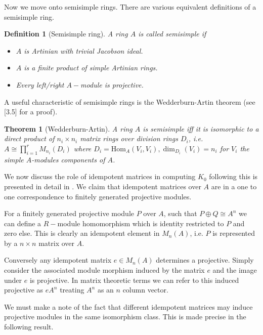 \documentclass[12pt]{report}
\numberwithin{equation}{section}
\newcommand{\Hom}{{\mathrm{Hom}}}
\newcounter{dummy} \numberwithin{dummy}{section}
\newtheorem{theorem}[dummy]{Theorem}
\newtheorem{definition}[dummy]{Definition}
\begin{document}
	
	Now we move onto semisimple rings. There are various equivalent definitions of a semisimple ring.
	\begin{definition}[Semisimple ring]
		A ring $A$ is called semisimple if
		\begin{itemize}
			\item $A$ is Artinian with trivial Jacobson ideal.
			\item $A$ is a finite product of simple Artinian rings.
			\item Every left/right $A-$module is projective.
		\end{itemize}
	\end{definition}
	
	A useful characteristic of semisimple rings is the Wedderburn-Artin theorem (see \cite{lam2001first}[3.5] for a proof).

	\begin{theorem}[Wedderburn-Artin]\label{wedart}
		A ring $A$ is semisimple iff it is isomorphic to a direct product of $n_i \times n_i$ matrix rings over division rings $D_i$, i.e. $A \cong \prod_{i=1}^r M_{n_i}(D_i)$ where $D_i =\Hom_A(V_i,V_i), \dim_{D_i}(V_i)=n_i$ for $V_i$ the simple $A$-modules components of $A$.
	\end{theorem}
	
	
	We now discuss the role of idempotent matrices in computing $K_0$ following \cite{weibel2013k} this is presented in detail in \cite{rosenberg1995algebraic}.
	We claim that idempotent matrices over $A$ are in a one to one correspondence to finitely generated projective modules. 
		
	For a finitely generated projective module $P$ over $A$, such that $P \oplus Q \cong A^n$ we can define a $R-$module homomorphism which is identity restricted to $P$ and zero else. This is clearly an idempotent element in $M_n(A)$, i.e. $P$ is represented by a $n\times n $ matrix over $A$.
	
	Conversely any idempotent matrix $e \in M_n(A)$ determines a projective. Simply consider the associated module morphism induced by the matrix $e$ and the image under $e$ is projective. In matrix theoretic terms we can refer to this induced projective as $eA^n$ treating $A^n$ as an $n$ column vector.
	
	We must make a note of the fact that different idempotent matrices may induce projective modules in the same isomorphism class. This is made precise in the following result.
	
\end{document}
